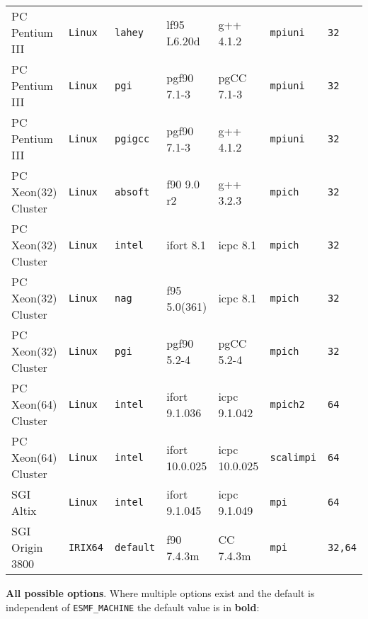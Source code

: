 \begin{tabular}{lllllll}
PC Pentium III  &\tt Linux  &\tt lahey   & lf95 \footnotesize L6.20d & g++ \footnotesize 4.1.2  &\tt mpiuni     &\tt 32 \\
PC Pentium III  &\tt Linux  &\tt pgi     & pgf90 \footnotesize 7.1-3 & pgCC \footnotesize 7.1-3 &\tt mpiuni     &\tt 32 \\
PC Pentium III  &\tt Linux  &\tt pgigcc  & pgf90 \footnotesize 7.1-3 & g++ \footnotesize 4.1.2  &\tt mpiuni     &\tt 32 \\
PC Xeon(32) Cluster &\tt Linux  &\tt absoft  & f90 \footnotesize 9.0 r2  & g++ \footnotesize 3.2.3  &\tt mpich      &\tt 32 \\
PC Xeon(32) Cluster &\tt Linux  &\tt intel   & ifort \footnotesize 8.1   & icpc \footnotesize 8.1   &\tt mpich      &\tt 32 \\
PC Xeon(32) Cluster &\tt Linux  &\tt nag     & f95 \footnotesize 5.0(361)& icpc \footnotesize 8.1   &\tt mpich      &\tt 32 \\
PC Xeon(32) Cluster &\tt Linux  &\tt pgi     & pgf90 \footnotesize 5.2-4 & pgCC \footnotesize 5.2-4 &\tt mpich      &\tt 32 \\
PC Xeon(64) Cluster &\tt Linux  &\tt intel   & ifort \footnotesize 9.1.036 & icpc \footnotesize 9.1.042 &\tt mpich2 &\tt 64 \\
PC Xeon(64) Cluster &\tt Linux  &\tt intel   & ifort \footnotesize 10.0.025 & icpc \footnotesize 10.0.025 &\tt scalimpi &\tt 64 \\
SGI Altix       &\tt Linux  &\tt intel   & ifort \footnotesize 9.1.045 & icpc \footnotesize 9.1.049 &\tt mpi    &\tt 64 \\
SGI Origin 3800 &\tt IRIX64 &\tt default & f90 \footnotesize 7.4.3m  & CC \footnotesize 7.4.3m  &\tt mpi        &\tt 32,64
\end{tabular}

\vspace{1ex}

{\bf All possible options}. Where multiple options exist 
and the default is independent of {\tt ESMF\_MACHINE} the default value is in {\bf bold}:

\vspace{1ex}


